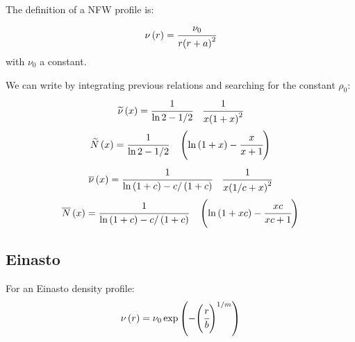\subsection{\citet{NFW+97}}

The definition of a NFW profile is:
%
\begin{equation}
    \nu \left(r\right) = \cfrac{\nu_0}{r {\left(r+a\right)}^2}
\end{equation}
%
with $\nu_0$ a constant.

We can write by integrating previous relations and searching for the constant
$\rho_0$:
%
\begin{equation}
    \widetilde\nu\left(x\right)=\cfrac{1}{\ln2-1/2}
        \quad\cfrac{1}{x{\left(1+x\right)}^2}
\end{equation}
%
\begin{equation}
    \widetilde{N}\left(x\right)=\cfrac{1}{\ln2-1/2}
        \quad\left(\ln\left(1+x\right)-\cfrac{x}{x+1}\right)
\end{equation}
%
\begin{equation}
    \overline\nu\left(x\right)=
        \cfrac{1}{\ln\left(1+c\right)-c/ \left(1+c\right)}
        \quad\cfrac{1}{x{\left(1/c+x\right)}^2}
\end{equation}
%
\begin{equation}
    \overline{N}\left(x\right)=
        \cfrac{1}{\ln \left(1+c\right)-c/ \left(1+c\right)}
        \quad\left(\ln\left(1+xc\right)-\cfrac{xc}{xc+1}\right)
\end{equation}

\subsection{Einasto}
\label{sub:einasto}

For an Einasto density profile:
\begin{equation}
    \nu \left(r\right) = \nu_0 \exp
    \left(- {\left(\cfrac{r}{b}\right)}^{1/m}\right)
\end{equation}

